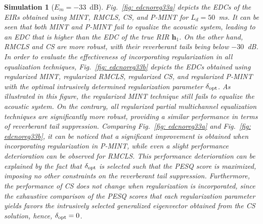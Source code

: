 \documentclass[10pt]{IEEEtran}
\newtheorem{simulation}{Simulation}
\begin{document}
\begin{simulation}[$E_m=-33$~dB]
\label{sim1} 
Fig.~\ref{fig: edcnoreg33a} depicts the EDCs of the EIRs obtained using MINT, RMCLS, CS, and P-MINT for $L_d = 50$~ms.
It can be seen that both MINT and P-MINT fail to equalize the acoustic system, leading to an EDC that is higher than the EDC of the true RIR $\mathbf{h}_1$.
On the other hand, RMCLS and CS are more robust, with their reverberant tails being below $-30$~dB.
In order to evaluate the effectiveness of incorporating regularization in all equalization techniques, Fig.~\ref{fig: edcnoreg33b} depicts the EDCs obtained using regularized MINT, regularized RMCLS, regularized CS, and regularized P-MINT with the optimal intrusively determined regularization parameter $\delta_{\rm opt}$.
As illustrated in this figure, the regularized MINT technique still fails to equalize the acoustic system.
On the contrary, all regularized partial multichannel equalization techniques are significantly more robust, providing a similar performance in terms of reverberant tail suppression.
Comparing Fig.~\ref{fig: edcnoreg33a} and Fig.~\ref{fig: edcnoreg33b}, it can be noticed that a significant improvement is obtained when incorporating regularization in P-MINT, while even a slight performance deterioration can be observed for RMCLS.
This performance deterioration can be explained by the fact that $\delta_{\rm opt}$ is selected such that the PESQ score is maximized, imposing no other constraints on the reverberant tail suppression.
Furthermore, the performance of CS does not change when regularization is incorporated, since the exhaustive comparison of the PESQ scores that each regularization parameter yields favors the intrusively selected generalized eigenvector obtained from the CS solution, hence, $\delta_{\rm opt} = 0$.



\end{simulation}
\end{document}
